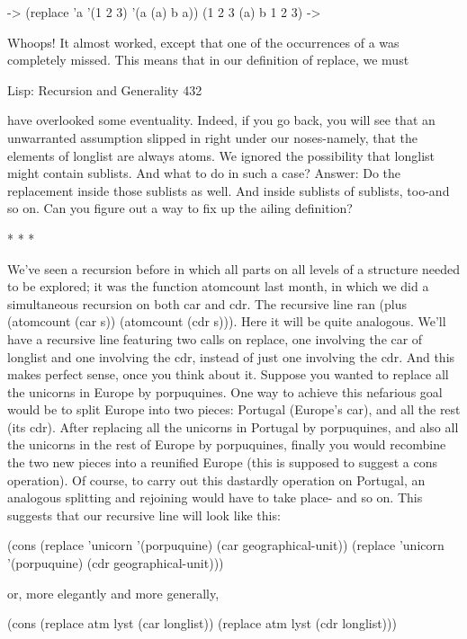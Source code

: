 -> (replace 'a '(1 2 3) '(a (a) b a))
(1 2 3 (a) b 1 2 3)
->

Whoops! It almost worked, except that one of the occurrences of a was completely
missed. This means that in our definition of replace, we must




Lisp: Recursion and Generality                                                     432

have overlooked some eventuality. Indeed, if you go back, you will see that an
unwarranted assumption slipped in right under our noses-namely, that the elements of
longlist are always atoms. We ignored the possibility that longlist might contain
sublists. And what to do in such a case? Answer: Do the replacement inside those
sublists as well. And inside sublists of sublists, too-and so on. Can you figure out a
way to fix up the ailing definition?

                                       *   *   *

We've seen a recursion before in which all parts on all levels of a structure needed to
be explored; it was the function atomcount last month, in which we did a
simultaneous recursion on both car and cdr. The recursive line ran (plus (atomcount
(car s)) (atomcount (cdr s))). Here it will be quite analogous. We'll have a recursive
line featuring two calls on replace, one involving the car of longlist and one involving
the cdr, instead of just one involving the cdr. And this makes perfect sense, once you
think about it. Suppose you wanted to replace all the unicorns in Europe by
porpuquines. One way to achieve this nefarious goal would be to split Europe into
two pieces: Portugal (Europe's car), and all the rest (its cdr). After replacing all the
unicorns in Portugal by porpuquines, and also all the unicorns in the rest of Europe by
porpuquines, finally you would recombine the two new pieces into a reunified Europe
(this is supposed to suggest a cons operation). Of course, to carry out this dastardly
operation on Portugal, an analogous splitting and rejoining would have to take place-
and so on. This suggests that our recursive line will look like this:

(cons (replace 'unicorn '(porpuquine) (car geographical-unit))
       (replace 'unicorn '(porpuquine) (cdr geographical-unit)))

or, more elegantly and more generally,

(cons (replace atm lyst (car longlist)) (replace atm lyst (cdr longlist)))

